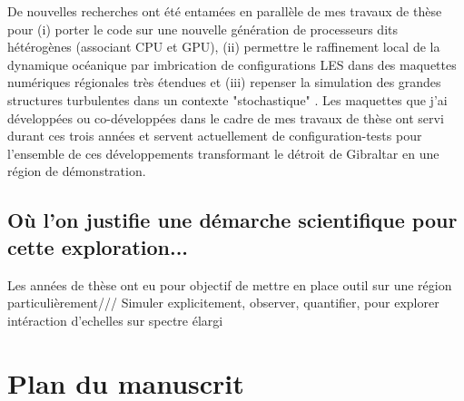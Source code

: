 De nouvelles recherches ont été entamées en parallèle de mes travaux de thèse pour (i) porter le code sur une nouvelle génération de processeurs dits hétérogènes (associant CPU et GPU), (ii) permettre le raffinement local de la dynamique océanique par imbrication de configurations LES dans des maquettes numériques régionales très étendues et (iii) repenser la simulation des grandes structures turbulentes dans un contexte "stochastique" \cite{memin_fluid_2014}. Les maquettes que j'ai développées ou co-développées dans le cadre de mes travaux de thèse ont servi durant ces trois années et servent actuellement de configuration-tests pour l'ensemble de ces développements transformant le détroit de Gibraltar en une région de démonstration. \\
\color{blue}
\subsection{Où l'on justifie une démarche scientifique pour cette exploration...}
\color{black}
Les années de thèse ont eu pour objectif de mettre en place outil sur une région particulièrement/// Simuler explicitement, observer, quantifier, pour explorer intéraction d'echelles sur spectre élargi


\section{Plan du manuscrit}






